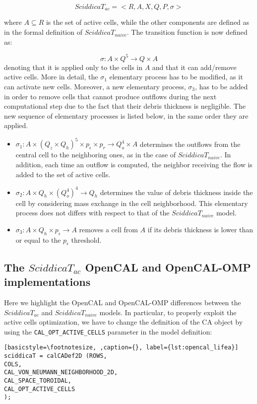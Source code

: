 $$SciddicaT_{ac} = < R, A, X, Q , P, \sigma >$$

\noindent where $A \subseteq R$ is the set of active cells, while
the other components are defined as in the formal definition of
$SciddicaT_{naive}$. The transition function is now defined as:

$$\sigma : A \times Q^5 \rightarrow Q \times A$$ denoting that it
is applied only to the cells in $A$ and that it can add/remove
active cells. More in detail, the $\sigma_1$ elementary process
has to be modified, as it can activate new cells. Moreover, a new
elementary process, $\sigma_3$, has to be added in order to remove
cells that cannot produce outflows during the next computational
step due to the fact that their debris thickness is
negligible. The new sequence of elementary processes is listed
below, in the same order they are applied.

\begin{itemize}
	\item $\sigma_1 : A \times (Q_z \times Q_h)^5 \times p_\epsilon
	\times p_r \rightarrow Q_o^4 \times A$ determines the outflows
	from the central cell to the neighboring ones, as in the case of
	$SciddicaT_{naive}$. In addition, each time an outflow is
	computed, the neighbor receiving the flow is added to the set of
	active cells.
	
	\item $\sigma_2: A \times Q_h \times (Q_o^4)^4 \rightarrow Q_h$
	determines the value of debris thickness inside the cell by
	considering mass exchange in the cell neighborhood. This
	elementary process does not differs with respect to that of the
	$SciddicaT_{naive}$ model.
	
	\item $\sigma_3: A \times Q_h \times p_\epsilon \rightarrow A$
	removes a cell from $A$ if its debris thickness is lower than or
	equal to the $p_\epsilon$ threshold.
\end{itemize}

\subsection{The $SciddicaT_{ac}$ OpenCAL and OpenCAL-OMP implementations}
Here we highlight the OpenCAL and OpenCAL-OMP differences between the $SciddicaT_{ac}$ and $SciddicaT_{naive}$ models. In particular, to properly exploit the active cells optimization, we have to change the definition of the CA object by using the \verb'CAL_OPT_ACTIVE_CELLS' parameter in the model
definition:
\begin{lstlisting}[basicstyle=\footnotesize, ,caption={}, label={lst:opencal_lifea}]
sciddicaT = calCADef2D (ROWS,
COLS,
CAL_VON_NEUMANN_NEIGHBORHOOD_2D,
CAL_SPACE_TOROIDAL,
CAL_OPT_ACTIVE_CELLS
);
\end{lstlisting}

